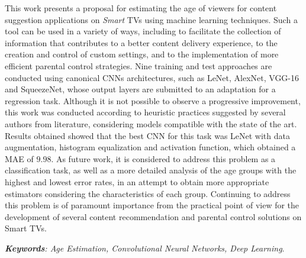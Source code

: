
  This work presents a proposal for estimating the age of viewers for content suggestion applications on \emph {Smart} TVs using machine learning techniques. Such a tool can be used in a variety of ways, including to facilitate the collection of information that contributes to a better content delivery experience, to the creation and control of custom settings, and to the implementation of more efficient parental control strategies. Nine training and test approaches are conducted using canonical CNNs architectures, such as LeNet, AlexNet, VGG-16 and SqueezeNet, whose output layers are submitted to an adaptation for a regression task. Although it is not possible to observe a progressive improvement, this work was conducted according to heuristic practices suggested by several authors from literature, considering models compatible with the state of the art. Results obtained showed that the best CNN for this task was LeNet with data augmentation, histogram equalization and activation function, which obtained a MAE of $9.98$. As future work, it is considered to address this problem as a classification task, as well as a more detailed analysis of the age groups with the highest and lowest error rates, in an attempt to obtain more appropriate estimators considering the characteristics of each group. Continuing to address this problem is of paramount importance from the practical point of view for the development of several content recommendation and parental control solutions on Smart TVs.

  \noindent \emph{\textbf{Keywords}: Age Estimation, Convolutional Neural Networks, Deep Learning}.
